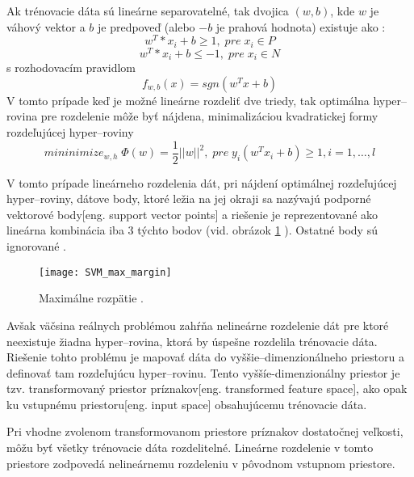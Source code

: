 Ak trénovacie dáta sú lineárne separovatelné, tak dvojica $(w, b)$, kde $w$ je váhový vektor a $b$ je predpoveď
    (alebo $-b$ je prahová hodnota) existuje ako \cite{prop:SupervisedMachineLearning}:
\begin{equation}
    \label{eq:SVMPair1}
    w^T * x_i + b \geq 1, \; pre \; x_i \in P
\end{equation}
\begin{equation}
    \label{eq:SVMPair2}
    w^T * x_i + b \leq -1, \; pre \; x_i \in N
\end{equation}
s rozhodovacím pravidlom
\begin{equation}
    \label{eq:SVMDecisionRule}
    f_{w,b}(x) = sgn(w^T x + b)
\end{equation}
V tomto prípade keď je možné lineárne rozdeliť dve triedy, tak optimálna hyper--rovina pre rozdelenie
    môže byť nájdena, minimalizáciou kvadratickej formy rozdeľujúcej hyper--roviny
\begin{equation}
    \label{eq:SVMDecisionRule}
    mininimize_{w,h} \; \Phi(w) = \frac{1}{2}||w||^2, \; pre \; y_i(w^Tx_i + b) \geq 1, i = 1, \dots, l
\end{equation}

V tomto prípade lineárneho rozdelenia dát, pri nájdení optimálnej rozdeľujúcej hyper--roviny, dátove body, ktoré ležia na jej okraji
    sa nazývajú podporné vektorové body[eng. support vector points] a riešenie je reprezentované ako lineárna kombinácia iba 3 týchto bodov (vid. obrázok \ref{pic:SVMMAxMargin} ).
Ostatné body sú ignorované \cite{prop:SupervisedMachineLearning}.

\begin{figure}[H]
	\centering
	\texttt{[image: SVM\_max\_margin]}
	\caption{Maximálne rozpätie \cite{prop:SupervisedMachineLearning}.}
	\label{pic:SVMMAxMargin}
\end{figure}

Avšak väčsina reálnych problémou zahŕňa nelineárne rozdelenie dát pre ktoré neexistuje žiadna hyper--rovina, ktorá by úspešne rozdelila trénovacie dáta.
Riešenie tohto problému je mapovať dáta do vyššie--dimenzionálneho priestoru a definovať tam rozdeľujúcu hyper--rovinu.
Tento vyššíe-dimenzionálny priestor je tzv. transformovaný priestor príznakov[eng. transformed feature space], ako opak ku vstupnému priestoru[eng. input space] obsahujúcemu trénovacie dáta\cite{prop:SupervisedMachineLearning}.

Pri vhodne zvolenom transformovanom priestore príznakov dostatočnej veľkosti, môžu byť všetky trénovacie dáta rozdelitelné.
Lineárne rozdelenie v tomto priestore zodpovedá nelineárnemu rozdeleniu v pôvodnom vstupnom priestore.

